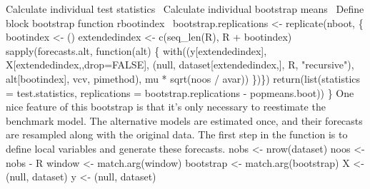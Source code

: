 \documentclass[10pt]{article}%
\begin{document}
  \LA{}Calculate individual test statistics~{\nwtagstyle{}}\RA{}
  \LA{}Calculate individual bootstrap means~{\nwtagstyle{}}\RA{}
  \LA{}Define block bootstrap function \code{}rbootindex\edoc{}~{\nwtagstyle{}}\RA{}
  bootstrap.replications <- replicate(nboot, \{
    bootindex <- ()
    extendedindex <- c(seq_len(R), R + bootindex)
    sapply(forecasts.alt, function(alt) \{
      with((y[extendedindex],
             X[extendedindex,,drop=FALSE],
             (null, dataset[extendedindex,], R, "recursive"),
             alt[bootindex], vcv, pimethod),
           mu * sqrt(noos / avar))
  \})\})
  return(list(statistics = test.statistics,
              replications = bootstrap.replications - popmeans.boot))
\}
\eatline
{}\nwendcode{}\nwdocspar
One nice feature of this bootstrap is that it's only necessary to
reestimate the benchmark model.  The alternative models are estimated
once, and their forecasts are resampled along with the original data.
The first step in the function is to define local variables and
generate these forecasts.
\nwenddocs{}\endmoddef\nwstartdeflinemarkup{}\nwenddeflinemarkup
nobs <- nrow(dataset)
noos <- nobs - R
window <- match.arg(window)
bootstrap <- match.arg(bootstrap)
X <- (null, dataset)
y <- (null, dataset)
\nwendcode{}\nwdocspar
\end{document}
